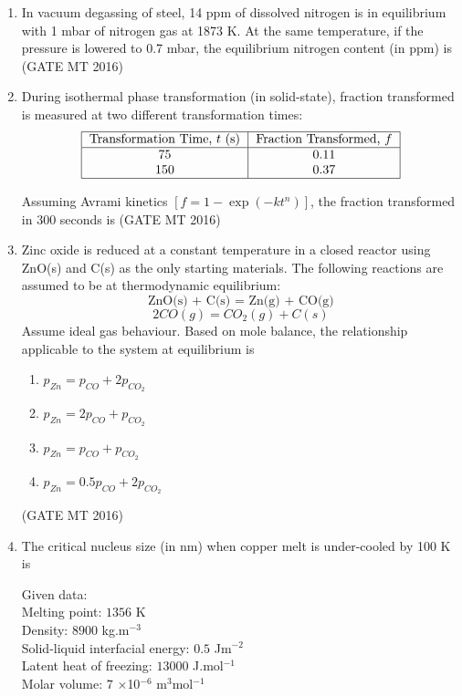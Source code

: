 \documentclass[11pt, letterpaper]{article}
\theoremstyle{remark}
\begin{document}
\begin{enumerate}
\item In vacuum degassing of steel, 14 ppm of dissolved nitrogen is in equilibrium with 1 mbar of nitrogen gas at 1873 K. At the same temperature, if the pressure is lowered to 0.7 mbar, the equilibrium nitrogen content (in ppm) is 
\hfill(GATE MT 2016)

\item During isothermal phase transformation (in solid-state), fraction transformed is measured at two different transformation times:
\begin{align}
    \begin{tabular}{|c|c|}
\hline
Transformation Time, $t$ (s) & Fraction Transformed, $f$ \\
\hline
75 & 0.11 \\
150 & 0.37 \\
\hline
\end{tabular}
\end{align}

Assuming Avrami kinetics $[f = 1 - \exp(-kt^n)]$, the fraction transformed in 300 seconds is 
\hfill(GATE MT 2016)

\item Zinc oxide is reduced at a constant temperature in a closed reactor using ZnO(s) and C(s) as the only starting materials. The following reactions are assumed to be at thermodynamic equilibrium:
\[
\text{ZnO(s) + C(s) = Zn(g) + CO(g)}
\]
\[
2CO(g) = CO_2(g) + C(s)
\]
Assume ideal gas behaviour. Based on mole balance, the relationship applicable to the system at equilibrium is
\begin{enumerate}
\item $p_{Zn} = p_{CO} + 2p_{CO_2}$
\item $p_{Zn} = 2p_{CO} + p_{CO_2}$
\item $p_{Zn} = p_{CO} + p_{CO_2}$
\item $p_{Zn} = 0.5p_{CO} + 2p_{CO_2}$
\end{enumerate}
\hfill(GATE MT 2016)

\item The critical nucleus size (in nm) when copper melt is under-cooled by 100 K is

Given data:\\  
Melting point: $1356$ K  \\
Density: $8900$ kg.m$^{-3}$  \\
Solid-liquid interfacial energy: $0.5$ Jm$^{-2}$ \\ 
Latent heat of freezing: $13000$ J.mol$^{-1}$  \\
Molar volume: $7$ $\times$10$^{-6}$ m$^{3}$mol$^{-1}$  


\end{enumerate}
\end{document}
